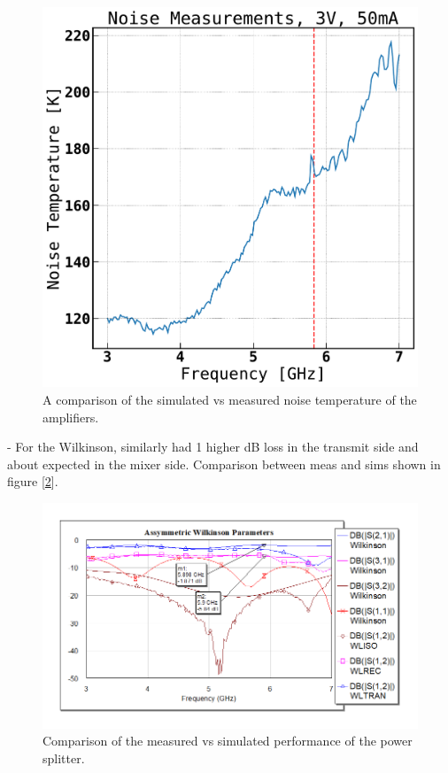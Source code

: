 \documentclass[reprint, aps, prl]{revtex4-1}
\begin{document}
\begin{figure}[!htbp]
    \centering
    \includegraphics[scale=0.35]{LNA_PA_noisemeas.pdf}
    \caption{A comparison of the simulated vs measured noise temperature of the amplifiers.}
    \label{fig:LNAPAnoise}
\end{figure}
- For the Wilkinson, similarly had 1 higher dB loss in the transmit side and about expected in the mixer side. Comparison between meas and sims shown in figure [\ref{fig:AsWilksimMeas}].



\begin{figure}[!htbp]
    \centering
    \includegraphics[scale=0.35]{Unbalanced_Wilkinson_Meas.png}
    \caption{Comparison of the measured vs simulated performance of the power splitter.}
    \label{fig:AsWilksimMeas}
\end{figure}
\end{document}

